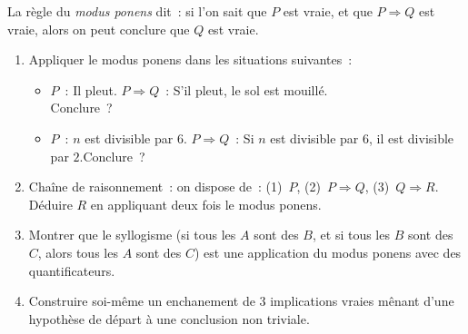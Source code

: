 \begin{challenge}
La r\`egle du \emph{modus ponens} dit~:
si l'on sait que $P$ est vraie, et que $P \Rightarrow Q$ est vraie,
alors on peut conclure que $Q$ est vraie.
\begin{enumerate}
  \item Appliquer le modus ponens dans les situations suivantes~:
        \begin{itemize}
          \item $P$~: \og Il pleut.\fg\quad
                $P\Rightarrow Q$~: \og S'il pleut, le sol est mouill\'e.\fg\\
                Conclure~?
          \item $P$~: \og $n$ est divisible par $6$.\fg\quad
                $P\Rightarrow Q$~: \og Si $n$ est divisible par $6$, il est
                divisible par $2$.\fg\quad Conclure~?
        \end{itemize}
  \item Cha\^ine de raisonnement~: on dispose de~:
        (1)~$P$, \quad (2)~$P\Rightarrow Q$, \quad (3)~$Q\Rightarrow R$.
        D\'eduire $R$ en appliquant deux fois le modus ponens.
  \item Montrer que le syll\-o\-gisme (si tous les $A$ sont des $B$,
        et si tous les $B$ sont des $C$, alors tous les $A$ sont des $C$)
        est une application du modus ponens avec des quantificateurs.
  \item Construire soi-m\^eme un enchanement de $3$ implications vraies
        m\^enant d'une hypoth\`ese de d\'epart \`a une conclusion non triviale.
\end{enumerate}
\end{challenge}

